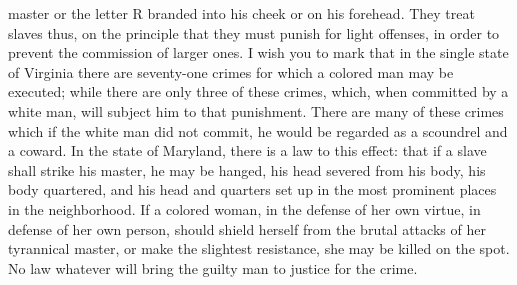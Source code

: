 master or the letter R branded into his cheek or on his forehead. They
treat slaves thus, on the principle that they must punish for light
offenses, in order to prevent the commission of larger ones. I wish you
to mark that in the single state of Virginia there are seventy-one
crimes for which a colored man may be executed; while there are only
three of these crimes, which, when committed by a white man, will
subject him to that punishment. There are many of these crimes which if
the white man did not commit, he would be regarded as a scoundrel and a
coward. In the state of Maryland, there is a law to this effect: that if
a slave shall strike his master, he may be hanged, his head severed from
his body, his body quartered, and his head and quarters set up in the
most prominent places in the neighborhood. If a colored woman, in the
defense of her own virtue, in defense of her own person, should shield
{\protect\hypertarget{415}{}{}}herself from the brutal attacks of her
tyrannical master, or make the slightest resistance, she may be killed
on the spot. No law whatever will bring the guilty man to justice for
the crime.

